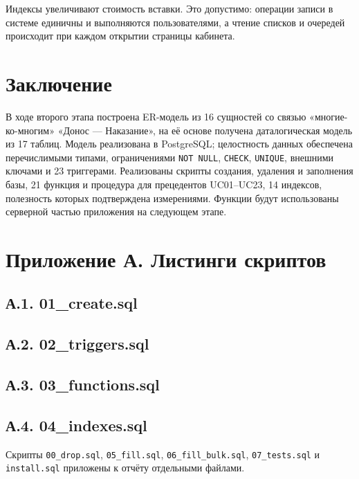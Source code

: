 \documentclass[12pt,a4paper]{article}
\begin{document}
Индексы увеличивают стоимость вставки. Это допустимо: операции записи в системе единичны и
выполняются пользователями, а чтение списков и очередей происходит при каждом открытии
страницы кабинета.

\section{Заключение}
В ходе второго этапа построена ER-модель из 16 сущностей со связью «многие-ко-многим»
«Донос — Наказание», на её основе получена даталогическая модель из 17 таблиц. Модель
реализована в PostgreSQL; целостность данных обеспечена перечислимыми типами, ограничениями
\texttt{NOT NULL}, \texttt{CHECK}, \texttt{UNIQUE}, внешними ключами и 23 триггерами. Реализованы
скрипты создания, удаления и заполнения базы, 21 функция и процедура для прецедентов UC01--UC23,
14 индексов, полезность которых подтверждена измерениями. Функции будут использованы
серверной частью приложения на следующем этапе.

\newpage
\section*{Приложение А. Листинги скриптов}
\subsection*{А.1. 01\_\allowbreak{}create.sql}

\subsection*{А.2. 02\_\allowbreak{}triggers.sql}

\subsection*{А.3. 03\_\allowbreak{}functions.sql}

\subsection*{А.4. 04\_\allowbreak{}indexes.sql}


Скрипты \texttt{00\_\allowbreak{}drop.sql}, \texttt{05\_\allowbreak{}fill.sql}, \texttt{06\_\allowbreak{}fill\_\allowbreak{}bulk.sql},
\texttt{07\_\allowbreak{}tests.sql} и \texttt{install.\allowbreak{}sql} приложены к отчёту отдельными файлами.
\end{document}
